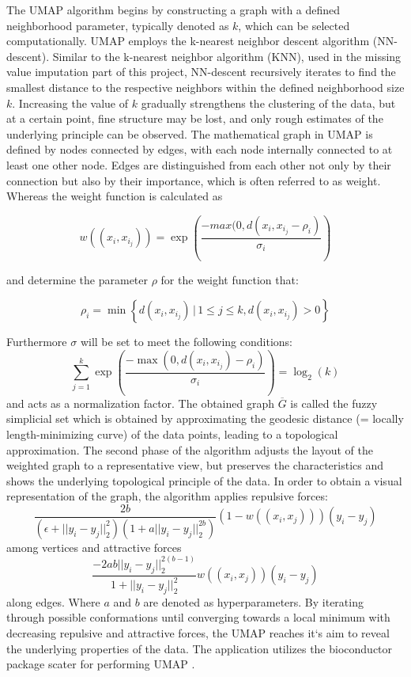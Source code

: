 \documentclass[
  11pt,
]{article}
\begin{document}
\citep{McInnes2018}

The UMAP algorithm begins by constructing a graph with a defined
neighborhood parameter, typically denoted as \(k\), which can be
selected computationally. UMAP employs the k-nearest neighbor descent
algorithm (NN-descent). Similar to the k-nearest neighbor algorithm
(KNN), used in the missing value imputation part of this project,
NN-descent recursively iterates to find the smallest distance to the
respective neighbors within the defined neighborhood size \(k\).
Increasing the value of \(k\) gradually strengthens the clustering of
the data, but at a certain point, fine structure may be lost, and only
rough estimates of the underlying principle can be observed. The
mathematical graph in UMAP is defined by nodes connected by edges, with
each node internally connected to at least one other node. Edges are
distinguished from each other not only by their connection but also by
their importance, which is often referred to as weight. Whereas the
weight function is calculated as

\[w((x_i, x_{i_{j}})) = \exp(\frac{-max(0,d(x_{i},x_{i_{j}}-\rho_{i})}{\sigma_{i}})\]

and determine the parameter \(\rho\) for the weight function that:

\[\rho_i=\min \left\{ d(x_i,x_{i_{j}}) \,|\, 1 \leq j \leq k, d(x_i, x_{i_{j}}) > 0 \right\}\]

Furthermore \(\sigma\) will be set to meet the following conditions:
\[\sum_{j=1}^{k} \exp ( \frac{ -\max(0, d(x_{i}, x_{i_{j}}) - \rho_i)} { \sigma_i } ) = \log_2(k)\]
and acts as a normalization factor. The obtained graph \(\overline{G}\)
is called the fuzzy simplicial set which is obtained by approximating
the geodesic distance (= locally length-minimizing curve) of the data
points, leading to a topological approximation. The second phase of the
algorithm adjusts the layout of the weighted graph to a representative
view, but preserves the characteristics and shows the underlying
topological principle of the data. In order to obtain a visual
representation of the graph, the algorithm applies repulsive forces:
\[\frac{2b}{(\epsilon + ||y_i-y_j||_{2}^{2})(1+a||y_i-y_j||_{2}^{2b})}(1-w((x_i,x_j)))(y_i-y_j)\]
among vertices and attractive forces
\[\frac{ -2ab || y_i -y_j||_{2}^{2(b-1)} }{1+||y_i-y_j||_{2}^{2}} w((x_i,x_j))(y_i-y_j)\]
along edges. Where \(a\) and \(b\) are denoted as hyperparameters. By
iterating through possible conformations until converging towards a
local minimum with decreasing repulsive and attractive forces, the UMAP
reaches it`s aim to reveal the underlying properties of the data. The
application utilizes the bioconductor package scater for performing UMAP
\citep{McCarthy2017}.
\end{document}
